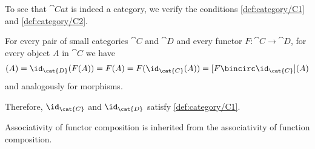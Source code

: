 \begin{defproof}
  To see that \( \cat{Cat} \) is indeed a category, we verify the conditions \ref{def:category/C1} and \ref{def:category/C2}.

   For every pair of small categories \( \cat{C} \) and \( \cat{D} \) and every functor \( F: \cat{C} \to \cat{D} \), for every object \( A \) in \( \cat{C} \) we have
  \begin{equation*}
    [\id_{\cat{D}} \bincirc F](A)
    =
    \id_{\cat{D}}(F(A))
    =
    F(A)
    =
    F(\id_{\cat{C}}(A))
    =
    [F \bincirc \id_{\cat{C}}](A)
  \end{equation*}
  and analogously for morphisms.

  Therefore, \( \id_{\cat{C}} \) and \( \id_{\cat{D}} \) satisfy \ref{def:category/C1}.

   Associativity of functor composition is inherited from the associativity of function composition.
\end{defproof}

